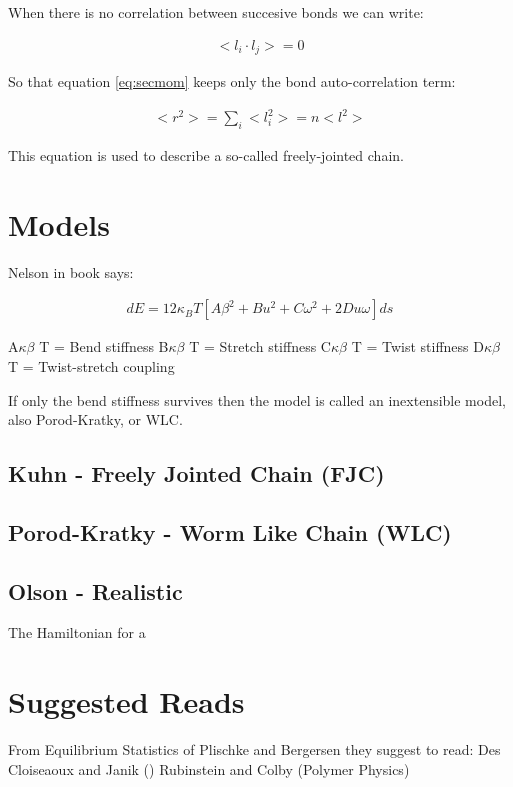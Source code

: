 When there is no correlation between succesive bonds we can write:

\begin{gather}
\label{eq:nocorr}
<l_{i} \cdot l_{j}> = 0
\end{gather}

So that equation \ref{eq:secmom} keeps only the bond auto-correlation term:

\begin{gather}
<r^2> = \sum_{i}<l_{i}^2> = n<l^2>
\end{gather}  

This equation is used to describe a so-called freely-jointed chain.





\section{Models}

Nelson in book says:

\begin{gather}
dE={1}{2}\kappa_{B}T[A\beta^2+Bu^2+C\omega^2+2Du\omega]ds
\end{gather}  

A$\kappa \beta$ T = Bend stiffness
B$\kappa \beta$ T = Stretch stiffness
C$\kappa \beta$ T = Twist stiffness
D$\kappa \beta$ T = Twist-stretch coupling

If only the bend stiffness survives then the model is called an
inextensible model, also Porod-Kratky, or WLC.

\subsection{Kuhn - Freely Jointed Chain (FJC)}

\subsection{Porod-Kratky - Worm Like Chain (WLC)}

\subsection{Olson - Realistic}

The Hamiltonian for a \cite{czapla2009}





\section{Suggested Reads}

From Equilibrium Statistics of Plischke and Bergersen they suggest to
read:
Des Cloiseaoux and Janik ()
Rubinstein and Colby (Polymer Physics)

